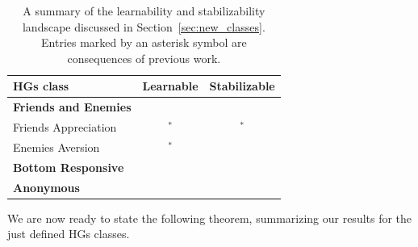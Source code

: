 \documentclass[letterpaper]{article} %
\newcommand{\cmark}{\ding{51}}%
\newcommand{\xmark}{\ding{55}}%
\begin{document}
\begin{table}\centering
\begin{tabular}{@{}lcc@{}}
\toprule
HGs class & Learnable & Stabilizable\\
\midrule
\textbf{Friends and Enemies} & & \\
Friends Appreciation & \cmark$^*$ & \cmark$^*$ \\
Enemies Aversion & \cmark$^*$ & \cmark \\
\textbf{Bottom Responsive} &  \xmark & \cmark\\
\textbf{Anonymous}  &\cmark & \xmark\\
\bottomrule
\end{tabular}\caption{A summary of the learnability and stabilizability landscape discussed in Section~\ref{sec:new_classes}. Entries marked by an asterisk symbol are consequences of previous work.}\label{table:summary}
\end{table}

We are now ready to state the following theorem, summarizing our results for the just defined HGs classes.
\end{document}
